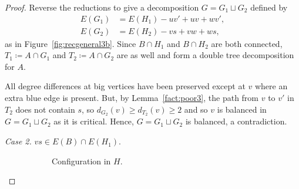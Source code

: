\documentclass[11pt, reqno, a4paper]{article}
\theoremstyle{definition}
\numberwithin{equation}{section}
\renewcommand{\geq}{\geqslant}
\begin{document}
\begin{proof}
Reverse the reductions to give a decomposition $G = G_1 \sqcup G_2$ defined by
\begin{align*}
E(G_1) &= E(H_1) - uv' + uv + wv', \\
E(G_2) &= E(H_2) - vs + vw + ws,
\end{align*}
as in Figure~\ref{fig:recgeneral3b}.
Since $B\cap H_1$ and $B\cap H_2$ are both connected, $T_1 \coloneqq A\cap G_1$ and $T_2 \coloneqq A\cap G_2$ are as well and form a double tree decomposition for $A$.

All degree differences at big vertices have been preserved except at \(v\) where an extra blue edge is present.
But, by Lemma~\ref{fact:poor3}, the path from $v$ to $v'$ in $T_2$ does not contain $s$, so $d_{G_2}(v)\geq d_{T_2}(v)\geq 2$ and so $v$ is balanced in $G= G_1\sqcup G_2$ as it is critical.
Hence, $G= G_1\sqcup G_2$ is balanced, a contradiction.

\textit{Case 2.} $vs\in E(B)\cap E(H_1)$.
\begin{figure}[ht] 
	\centering
    \begin{subfigure}{0.4\textwidth}
    \centering
	\caption{Configuration in $H$.} 
    \end{subfigure} 
    \begin{subfigure}{0.4\textwidth}
    \centering
\end{subfigure}
\end{figure}
\end{proof}
\end{document}
